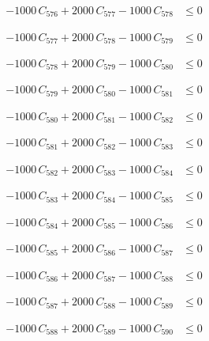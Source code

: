\documentclass[a4paper,11pt]{article}
\begin{document}
\begin{align}
-1000\,C_{576} + 2000\,C_{577} - 1000\,C_{578} &\leq 0 \nonumber
\end{align}

\begin{align}
-1000\,C_{577} + 2000\,C_{578} - 1000\,C_{579} &\leq 0 \nonumber
\end{align}

\begin{align}
-1000\,C_{578} + 2000\,C_{579} - 1000\,C_{580} &\leq 0 \nonumber
\end{align}

\begin{align}
-1000\,C_{579} + 2000\,C_{580} - 1000\,C_{581} &\leq 0 \nonumber
\end{align}

\begin{align}
-1000\,C_{580} + 2000\,C_{581} - 1000\,C_{582} &\leq 0 \nonumber
\end{align}

\begin{align}
-1000\,C_{581} + 2000\,C_{582} - 1000\,C_{583} &\leq 0 \nonumber
\end{align}

\begin{align}
-1000\,C_{582} + 2000\,C_{583} - 1000\,C_{584} &\leq 0 \nonumber
\end{align}

\begin{align}
-1000\,C_{583} + 2000\,C_{584} - 1000\,C_{585} &\leq 0 \nonumber
\end{align}

\begin{align}
-1000\,C_{584} + 2000\,C_{585} - 1000\,C_{586} &\leq 0 \nonumber
\end{align}

\begin{align}
-1000\,C_{585} + 2000\,C_{586} - 1000\,C_{587} &\leq 0 \nonumber
\end{align}

\begin{align}
-1000\,C_{586} + 2000\,C_{587} - 1000\,C_{588} &\leq 0 \nonumber
\end{align}

\begin{align}
-1000\,C_{587} + 2000\,C_{588} - 1000\,C_{589} &\leq 0 \nonumber
\end{align}

\begin{align}
-1000\,C_{588} + 2000\,C_{589} - 1000\,C_{590} &\leq 0 \nonumber
\end{align}
\end{document}
